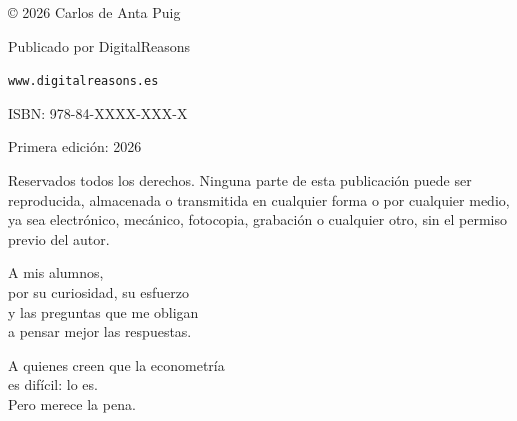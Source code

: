 \thispagestyle{empty}

\vspace*{6cm}

\begin{center}

{\small
© 2026 Carlos de Anta Puig}

\vspace{0.5cm}

{\small
Publicado por DigitalReasons}

\vspace{0.5cm}

{\small
\texttt{www.digitalreasons.es}}

\vspace{1cm}

{\small
ISBN: 978-84-XXXX-XXX-X}

\vspace{0.5cm}

{\small
Primera edición: 2026}

\vspace{0.5cm}

{\small
Reservados todos los derechos. Ninguna parte de esta publicación puede ser reproducida, almacenada o transmitida en cualquier forma o por cualquier medio, ya sea electrónico, mecánico, fotocopia, grabación o cualquier otro, sin el permiso previo del autor.}

\end{center}

\clearpage

\thispagestyle{empty}
\begin{center}
\vspace*{3cm}
{\large\itshape

A mis alumnos,\\
por su curiosidad, su esfuerzo\\
y las preguntas que me obligan\\
a pensar mejor las respuestas.

\vspace{1.5cm}

A quienes creen que la econometría\\
es difícil: lo es.\\
Pero merece la pena.

}
\vspace*{\fill}
\end{center}
\clearpage
